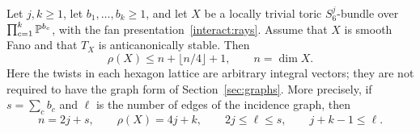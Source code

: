 \begin{theorem}\label{interact:bound}
Let $j,k\ge1$, let $b_1,\ldots,b_k\ge1$, and let $X$ be a locally
trivial toric $S_6^j$-bundle over $\prod_{c=1}^k\mathbb{P}^{b_c}$, with the fan presentation~\eqref{interact:rays}. Assume that
$X$ is smooth Fano and that $T_X$ is anticanonically stable. Then
\[
 \rho(X)\le n+\lfloor n/4\rfloor+1,
 \qquad n=\dim X.
\]
Here the twists in each hexagon lattice are arbitrary integral vectors;
they are not required to have the graph form of Section~\ref{sec:graphs}.
More precisely, if $s=\sum_cb_c$ and $\ell$ is the number of edges of
the incidence graph, then
\begin{equation}\label{interact:incidence-inequalities}
 n=2j+s,\qquad \rho(X)=4j+k,\qquad
 2j\le\ell\le s,\qquad j+k-1\le\ell.
\end{equation}
\end{theorem}
